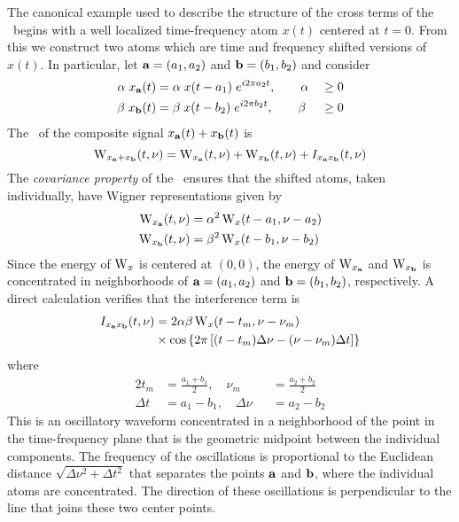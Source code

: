 The canonical example used to describe the structure of the 
cross terms of the \WT\ begins with a well localized time-frequency atom
$x(t)$ centered at $t=0$. %
From this we construct two atoms
which are time 
and frequency shifted versions of $x(t)$.  In particular, let $\mathbf{a} = (a_1,a_2)$
and $\mathbf{b} = (b_1,b_2)$ and consider
\begin{alignat*}{2}%
\alpha\; x_\a(t)&=\alpha \;x(t-a_1)\; e^{i2\pi a_2t}, \qquad \alpha\; &\geq 0\\
\beta\; x_\b(t)&=\beta\;x(t-b_2)\;e^{i2\pi b_2t}, \qquad \beta &\geq 0
\end{alignat*}%
The \WT\ of the composite signal $x_{\mathbf{a}}(t)+x_{\mathbf{b}}(t)$ is
\[
  \operatorname{W}_{x_{\mathbf{a}}+x_{\mathbf{b}}}(t,\nu) 
    = \operatorname{W}_{x_{\mathbf{a}}}(t,\nu)+\operatorname{W}_{x_{\mathbf{b}}}(t,\nu) + I_{x_{\mathbf{a}} x_{\mathbf{b}}}(t,\nu)
\]
The \emph{covariance property} of the \WT\ ensures that
the shifted atoms, taken individually, have Wigner representations
given by  
\begin{align*}
\operatorname{W}_{x_{\mathbf{a}}}(t,\nu) &= \alpha^2\operatorname{W}_x(t-a_1,\nu-a_2)\\
\operatorname{W}_{x_{\mathbf{b}}}(t,\nu) &= \beta^2\operatorname{W}_x(t-b_1,\nu-b_2)
\end{align*}
Since the energy of $\operatorname{W}_x$ is centered at $(0,0)$, the energy of
$\operatorname{W}_{x_{\mathbf{a}}}$ and $\operatorname{W}_{x_{\mathbf{b}}}$ is concentrated in neighborhoods of
$\mathbf{a} = (a_1,a_2)$ and $\mathbf{b} = (b_1,b_2)$, respectively.  A direct calculation
verifies that the interference term is
\begin{align*}
  I_{x_{\mathbf{a}} x_{\mathbf{b}}}(t,\nu)&=
    2\alpha \beta \operatorname{W}_x(t-t_m,\nu-\nu_m)\\
    & \times \cos\left\{2\pi \left[(t-t_m)\Delta\nu 
               -(\nu-\nu_m)\Delta t \right]\right\}
\end{align*}
where %
\begin{alignat*}{2}%
  t_m    &= \frac{a_1+b_1}{2}, \quad 
  \nu_m &&= \frac{a_2+b_2}{2}\\
  \Delta t    &= a_1-b_1,\quad
  \Delta \nu &&= a_2-b_2
\end{alignat*}
This is an oscillatory waveform concentrated in a neighborhood of the
point in the time-frequency plane that is the geometric midpoint 
between the individual components.  The frequency of the oscillations
is proportional to the Euclidean distance
$\sqrt{\Delta \nu^2 + \Delta t^2}$ that separates the points
$\mathbf{a} $ and $\mathbf{b}$, where the individual atoms are
concentrated.  The direction of these oscillations is perpendicular to
the line that joins these two center points.

